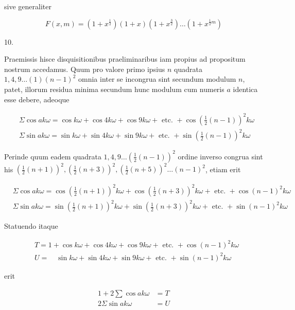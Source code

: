 \documentclass[10pt]{article}
\begin{document}
sive generaliter

\[
F(x, m)=\left(1+x^{\frac{1}{2}}\right)(1+x)\left(1+x^{\frac{3}{2}}\right) \ldots\left(1+x^{\frac{1}{2} m}\right)
\]

10.

Praemissis hisce disquisitionibus praeliminaribus iam propius ad propositum nostrum accedamus. Quum pro valore primo ipsius \(n\) quadrata \(1,4,9 \ldots(1)(n-1)^{2}\) omnia inter se incongrua sint secundum modulum \(n\), patet, illorum residua minima secundum hunc modulum cum numeris \(a\) identica esse debere, adeoque

\[
\begin{aligned}
& \Sigma \cos a k \omega=\cos k \omega+\cos 4 k \omega+\cos 9 k \omega+\text { etc. }+\cos \left(\frac{1}{2}(n-1)\right)^{2} k \omega \\
& \Sigma \sin a k \omega=\sin k \omega+\sin 4 k \omega+\sin 9 k \omega+\text { etc. }+\sin \left(\frac{1}{2}(n-1)\right)^{2} k \omega
\end{aligned}
\]

Perinde quum eadem quadrata \(1,4,9 \ldots\left(\frac{1}{2}(n-1)\right)^{2}\) ordine inverso congrua sint his \(\left(\frac{1}{2}(n+1)\right)^{2},\left(\frac{1}{2}(n+3)\right)^{2},\left(\frac{1}{2}(n+5)\right)^{2} \ldots(n-1)^{2}\), etiam erit

\[
\begin{aligned}
& \Sigma \cos a k \omega=\cos \left(\frac{1}{2}(n+1)\right)^{2} k \omega+\cos \left(\frac{1}{2}(n+3)\right)^{2} k \omega+\text { etc. }+\cos (n-1)^{2} k \omega \\
& \Sigma \sin a k \omega=\sin \left(\frac{1}{2}(n+1)\right)^{2} k \omega+\sin \left(\frac{1}{2}(n+3)\right)^{2} k \omega+\text { etc. }+\sin (n-1)^{2} k \omega
\end{aligned}
\]

Statuendo itaque

\[
\begin{aligned}
& T=1+\cos k \omega+\cos 4 k \omega+\cos 9 k \omega+\text { etc. }+\cos (n-1)^{2} k \omega \\
& U=\quad \sin k \omega+\sin 4 k \omega+\sin 9 k \omega+\text { etc. }+\sin (n-1)^{2} k \omega
\end{aligned}
\]

erit

\[
\begin{aligned}
1+2 \sum \cos a k \omega & =T \\
2 \Sigma \sin a k \omega & =U
\end{aligned}
\]
\end{document}
